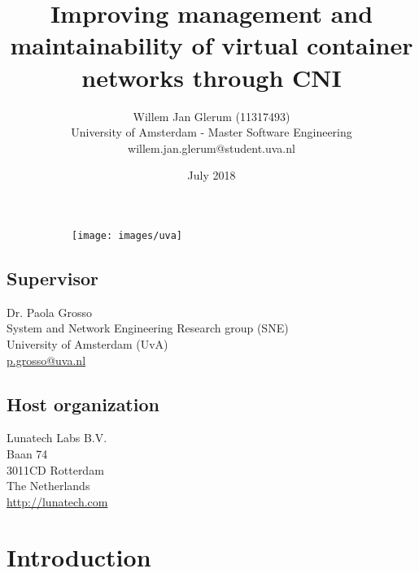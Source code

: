 \documentclass{article}
\title{Improving management and maintainability of virtual container networks through CNI}
\author{Willem Jan Glerum (11317493)
\\ University of Amsterdam - Master Software Engineering
\\willem.jan.glerum@student.uva.nl}
\date{July 2018}
\begin{document}
\maketitle

\begin{figure}
\centering
\begin{subfigure}{.5\textwidth}
  \centering
  \texttt{[image: images/uva]}
\end{subfigure}
\end{figure}

\newpage

\subsection*{Supervisor}
Dr. Paola Grosso\\
System and Network Engineering Research group (SNE)\\
University of Amsterdam (UvA)\\
\url{p.grosso@uva.nl}

\subsection*{Host organization}
Lunatech Labs B.V.\\
Baan 74\\
3011CD Rotterdam\\
The Netherlands\\
\url{http://lunatech.com}

\newpage
\tableofcontents
\newpage

\section{Introduction}


\printbibliography
\end{document}
